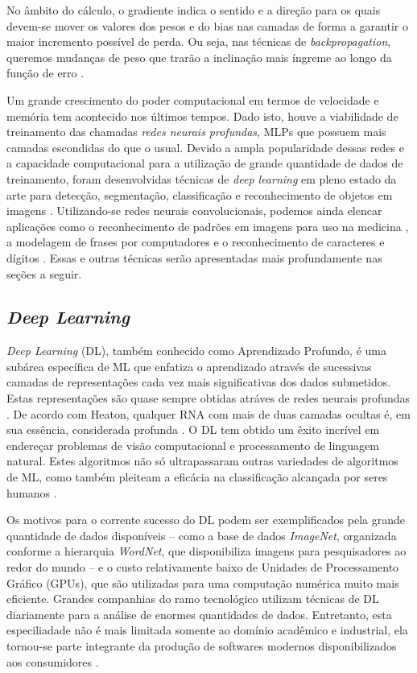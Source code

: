 No âmbito do cálculo, o gradiente indica o sentido e a direção para os quais devem-se mover os valores dos pesos e do bias nas camadas de forma a garantir o maior incremento possível de perda. Ou seja, nas técnicas de \emph{backpropagation}, queremos mudanças de peso que trarão a inclinação mais íngreme ao longo da função de erro \cite{goodfellow, kubat}.

Um grande crescimento do poder computacional em termos de velocidade e memória tem acontecido nos últimos tempos. Dado isto, houve a viabilidade de treinamento das chamadas \emph{redes neurais profundas}, MLPs que possuem mais camadas escondidas do que o usual. Devido a ampla popularidade dessas redes e a capacidade computacional para a utilização de grande quantidade de dados de treinamento, foram desenvolvidas técnicas de \emph{deep learning} em pleno estado da arte para detecção, segmentação, classificação e reconhecimento de objetos em imagens \cite{khan}. Utilizando-se redes neurais convolucionais, podemos ainda elencar aplicações como o reconhecimento de padrões em imagens para uso na medicina \cite{cha}, a modelagem de frases por computadores \cite{kalchbrenner} e o reconhecimento de caracteres e dígitos \cite{lecun}. Essas e outras técnicas serão apresentadas mais profundamente nas seções a seguir.


\subsection{\emph{Deep Learning}}
\label{subsec:dl}

\emph{Deep Learning} (DL), também conhecido como Aprendizado Profundo, é uma subárea específica de ML que enfatiza o aprendizado através de sucessivas camadas de representações cada vez mais significativas dos dados submetidos. Estas representações são quase sempre obtidas atráves de redes neurais profundas \cite{chollet}. De acordo com Heaton, qualquer RNA com mais de duas camadas ocultas é, em sua essência, considerada profunda \cite{heaton}. O DL tem obtido um êxito incrível em endereçar problemas de visão computacional e processamento de linguagem natural. Estes algoritmos não só ultrapassaram outras variedades de algoritmos de ML, como também pleiteam a eficácia na classificação alcançada por seres humanos \cite{buduma}.

Os motivos para o corrente sucesso do DL podem ser exemplificados pela grande quantidade de dados disponíveis -- como a base de dados \emph{ImageNet}, organizada conforme a hierarquia \emph{WordNet}, que disponibiliza imagens para pesquisadores ao redor do mundo \cite{imagenet} -- e o custo relativamente baixo de Unidades de Processamento Gráfico (GPUs), que são utilizadas para uma computação numérica muito mais eficiente. Grandes companhias do ramo tecnológico utilizam técnicas de DL diariamente para a análise de enormes quantidades de dados. Entretanto, esta especiliadade não é mais limitada somente ao domínio acadêmico e industrial, ela tornou-se parte integrante da produção de softwares modernos disponibilizados aos consumidores \cite{gulli}.

